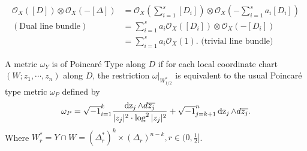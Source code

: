 \documentclass[lang=en,12pt]{beautybook}
\begin{document}
\begin{remark}
  \begin{align*}
    \mathcal{O}_X([D])\otimes\mathcal{O}_X(-[\Delta]) & =\mathcal{O}_X(\sum_{i=1}^{s}[D_i])\otimes\mathcal{O}_X(-\sum_{i=1}^{s}a_i[D_i]) \\
    (\text{Dual line bundle})                         & =\sum_{i=1}^{s}a_i \mathcal{O}_X([D_i])\otimes\mathcal{O}_X(-[D_i])              \\
                                                      & =\sum_{i=1}^{s}a_i \mathcal{O}_X(1). \text{ (trivial line bundle)}
  \end{align*}

\end{remark}
\begin{definition}
  A metric $\omega_Y$ is of Poincar\'e Type along $D$ if for each local
  coordinate chart $(W ; z_1, \cdots, z_n)$ along $D$, the restriction $\omega
    |_{W_{1 / 2}^{\ast}} $ is equivalent to the usual Poincar\'e type
  metric $\omega_P$ defined by
  \[ \omega_P = \sqrt{- 1} \relax_{i = 1}^k \frac{\operatorname{dz}_j \wedge d
      \overline{z_j}}{| z_j |^2 \cdot \log^2 | z_j |^2} + \sqrt{- 1} \relax_{j =
      k + 1}^n \operatorname{dz}_j \wedge d \overline{z_j} . \]
  Where $W_{r}^{\ast}=Y\cap W=(\Delta_r^*)^{k}\times (\Delta_r)^{n-k}, r\in (0,\frac{1}{2}]$.
\end{definition}
\end{document}

